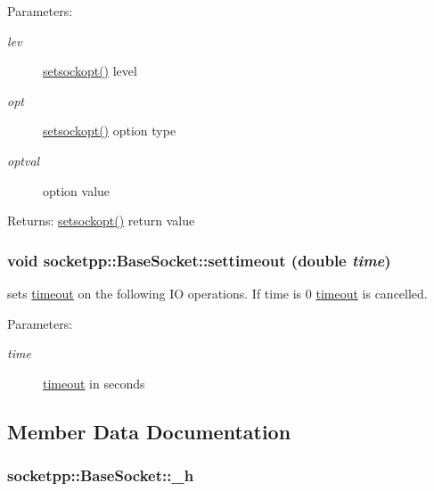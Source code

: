 \begin{CompactItemize}
\begin{Desc}
\item[Parameters:]
\begin{description}
\item[{\em lev}]\hyperlink{classsocketpp_1_1BaseSocket_3f1f168e4953c046bb1159941da2fa30}{setsockopt()} level \item[{\em opt}]\hyperlink{classsocketpp_1_1BaseSocket_3f1f168e4953c046bb1159941da2fa30}{setsockopt()} option type \item[{\em optval}]option value \end{description}
\end{Desc}
\begin{Desc}
\item[Returns:]\hyperlink{classsocketpp_1_1BaseSocket_3f1f168e4953c046bb1159941da2fa30}{setsockopt()} return value \end{Desc}
\hypertarget{classsocketpp_1_1BaseSocket_0804d148470fd742cda495d3533b25c6}{
\subsubsection[{settimeout}]{\setlength{\rightskip}{0pt plus 5cm}void socketpp::BaseSocket::settimeout (double {\em time})}}
\label{classsocketpp_1_1BaseSocket_0804d148470fd742cda495d3533b25c6}


sets \hyperlink{classsocketpp_1_1timeout}{timeout} on the following IO operations. If time is 0 \hyperlink{classsocketpp_1_1timeout}{timeout} is cancelled. 

\begin{Desc}
\item[Parameters:]
\begin{description}
\item[{\em time}]\hyperlink{classsocketpp_1_1timeout}{timeout} in seconds \end{description}
\end{Desc}


\subsection{Member Data Documentation}
\hypertarget{classsocketpp_1_1BaseSocket_1e44e3c6c2ecd89c2aa716cc62528620}{
\subsubsection[{\_\-h}]{ {\bf socketpp::BaseSocket::\_\-h}}}
\label{classsocketpp_1_1BaseSocket_1e44e3c6c2ecd89c2aa716cc62528620}



\end{CompactItemize}
